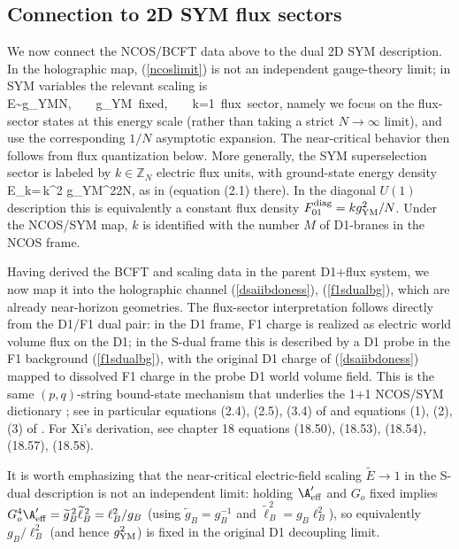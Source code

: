 \documentclass[12pt]{article}
\newcommand{\wt}[1]{\widetilde{#1}}
\begin{document}
\subsection{Connection to 2D SYM flux sectors}
We now connect the NCOS/BCFT data above to the dual 2D SYM description. In the holographic map, (\ref{ncoslimit}) is not an independent gauge-theory limit; in SYM variables the relevant scaling is
\ie\label{symncoslimit}
E\sim {g_{\rm YM}\over N},~~~~g_{\rm YM}~{\rm fixed},~~~~k=1~{\rm flux~sector},
\fe
namely we focus on the flux-sector states at this energy scale (rather than taking a strict $N\to\infty$ limit), and use the corresponding $1/N$ asymptotic expansion. The near-critical behavior then follows from flux quantization below.
More generally, the SYM superselection sector is labeled by $k\in\mathbb{Z}_N$ electric flux units, with ground-state energy density
\ie\label{symfluxenergy}
E_k=\,{k^2 g_{\rm YM}^2\over 2N},
\fe
as in \cite{cho2026fluxsectorsmatrixstring} (equation (2.1) there). In the diagonal $U(1)$ description this is equivalently a constant flux density $F_{01}^{\rm diag}=k g_{\rm YM}^2/N$. Under the NCOS/SYM map, $k$ is identified with the number $M$ of D1-branes in the NCOS frame.


Having derived the BCFT and scaling data in the parent D1$+$flux system, we now map it into the holographic channel (\ref{dsaiibdoness}), (\ref{f1sdualbg}), which are already near-horizon geometries. The flux-sector interpretation follows directly from the D1/F1 dual pair: in the D1 frame, F1 charge is realized as electric world volume flux on the D1; in the S-dual frame this is described by a D1 probe in the F1 background (\ref{f1sdualbg}), with the original D1 charge of (\ref{dsaiibdoness}) mapped to dissolved F1 charge in the probe D1 world volume field. This is the same $(p,q)$-string bound-state mechanism that underlies the 1+1 NCOS/SYM dictionary \cite{gopakumar2000sdualitynoncommutativegaugetheory,klebanov200011dimensionalncosun,yin2026foundationsofstringtheory}; see in particular equations (2.4), (2.5), (3.4) of \cite{gopakumar2000sdualitynoncommutativegaugetheory} and equations (1), (2), (3) of \cite{klebanov200011dimensionalncosun}. For Xi's derivation, see chapter 18 equations (18.50), (18.53), (18.54), (18.57), (18.58).

It is worth emphasizing that the near-critical electric-field scaling $\widetilde E\to 1$ in the S-dual description is not an independent limit: holding $\A'_{\rm eff}$ and $G_o$ fixed implies $G_o^4\A'_{\rm eff}=\wt g_B^{\,2}\wt\ell_B^{\,2}=\ell_B^2/g_B$ (using $\wt g_B=g_B^{-1}$ and $\wt\ell_B^2=g_B\ell_B^2$), so equivalently $g_B/\ell_B^2$ (and hence $g_{\rm YM}^2$) is fixed in the original D1 decoupling limit.
\end{document}
